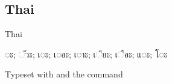\subsection{Thai}

\newfontfamily{}

\def\thaitext#1{{\thai#1}}

\begin{scriptexample}[]{Thai}
\centerline{\LARGE\thaitext{◌ะ; ◌ัวะ; เ◌ะ; เ◌อะ; เ◌าะ; เ◌ียะ; เ◌ือะ; แ◌ะ; โ◌ะ}}


\hfill Typeset with  and the command \cmd{\thai}
\end{scriptexample}